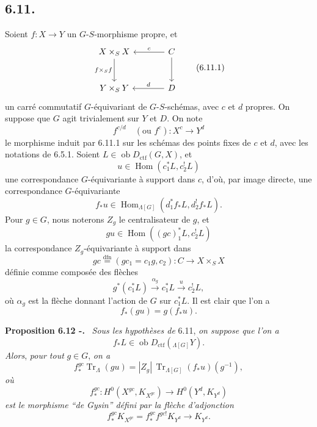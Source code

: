 \documentclass[11pt]{article}
\newenvironment{statement}[1]{\par\medskip\noindent\textbf{#1.}\ }{\par\medskip}
\DeclareMathOperator{\Hom}{Hom}
\providecommand{\Tr}{\operatorname{Tr}}
\providecommand{\Tr}{\operatorname{Tr}}
\providecommand{\Ob}{\operatorname{ob}}
\providecommand{\Tr}{\operatorname{Tr}}
\providecommand{\Hom}{\operatorname{Hom}}
\providecommand{\Ob}{\operatorname{ob}}
\providecommand{\Tr}{\operatorname{Tr}}
\providecommand{\Ob}{\operatorname{Ob}}
\providecommand{\Hom}{\operatorname{Hom}}
\providecommand{\Tr}{\operatorname{Tr}}
\providecommand{\Ob}{\operatorname{ob}}
\providecommand{\Ob}{\operatorname{Ob}}
\begin{document}
\subsection*{6.11.}
Soient $f:X\to Y$ un $G$-$S$-morphisme propre, et
\begin{equation}
\begin{tikzcd}[column sep=large,row sep=large]
X\times_SX \arrow[d,"f\times_Sf"'] & C \arrow[l,"c"'] \arrow[d]\\
Y\times_SY & D \arrow[l,"d"']
\end{tikzcd}
\tag{6.11.1}
\end{equation}
un carré commutatif $G$-équivariant de $G$-$S$-schémas, avec $c$ et $d$ propres. On suppose que $G$ agit trivialement sur $Y$ et $D$. On note
\begin{equation}
f^{c/d}\quad(\text{ou } f^c):X^c\longrightarrow Y^d
\tag{6.11.2}
\end{equation}
le
morphisme induit par 6.11.1 sur les schémas des points fixes de $c$ et $d$, avec les notations de 6.5.1. Soient $L\in\Ob D_{\mathrm{ctf}}(G,X)$, et
\[
u\in\Hom(c_1^*L,c_2^!L)
\]
une correspondance $G$-équivariante à support dans $c$, d'où, par image directe, une correspondance $G$-équivariante
\[
f_*u\in\Hom_{\Lambda[G]}(d_1^*f_*L,d_2^!f_*L).
\]
Pour $g\in G$, nous noterons $Z_g$ le centralisateur de $g$, et
\begin{equation}
gu\in\Hom((gc)_1^*L,c_2^!L)
\tag{6.11.3}
\end{equation}
la correspondance $Z_g$-équivariante à support dans
\begin{equation}
gc\stackrel{\mathrm{dfn}}{=}(gc_1=c_1g,c_2):C\to X\times_SX
\tag{6.11.4}
\end{equation}
définie comme composée des flèches
\[
g^*(c_1^*L)\xrightarrow{\alpha_g}c_1^*L\xrightarrow{u}c_2^!L,
\]
où $\alpha_g$ est la flèche donnant l'action de $G$ sur $c_1^*L$. Il est clair que l'on a
\begin{equation}
f_*(gu)=g(f_*u).
\tag{6.11.5}
\end{equation}

\begin{statement}{Proposition 6.12 -}
\emph{Sous les hypothèses de} 6.11, \emph{on suppose que l'on a}
\[
f_*L\in\Ob D_{\mathrm{ctf}}({}_{\Lambda[G]}Y).
\]
\emph{Alors}, \emph{pour tout} $g\in G$, \emph{on a}
\begin{equation}
f_*^{gc}\Tr_{\Lambda}(gu)
=
|Z_g|\,\Tr_{\Lambda[G]}(f_*u)(g^{-1}),
\tag{6.12.1}
\end{equation}
\emph{où}
\[
f_*^{gc}:H^0(X^{gc},K_{X^{gc}})\longrightarrow H^0(Y^d,K_{Y^d})
\]
\emph{est le morphisme ``de Gysin'' défini par la flèche d'adjonction}
\[
f_*^{gc}K_{X^{gc}}=f_*^{gc}f^{gc!}K_{Y^d}\longrightarrow K_{Y^d}.
\]
\end{statement}
\end{document}
